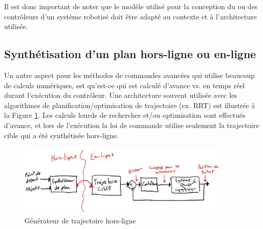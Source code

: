 Il est donc important de noter que le modèle utilisé pour la conception du ou des contrôleurs d'un système robotisé doit être adapté au contexte et à l'architecture utilisée. 


\subsection{Synthétisation d'un plan hors-ligne ou en-ligne}

Un autre aspect pour les méthodes de commandes avancées qui utilise beaucoup de calculs numériques, est qu'est-ce qui est calculé d'avance vs. en temps réel durant l'exécution du contrôleur. Une architecture souvent utilisée avec les algorithmes de planification/optimisation de trajectoire (ex. RRT) est illustrée à la Figure \ref{fig:offlinetrajectorygeneration}. Les calculs lourds de rechercher et/ou optimisation sont effectués d'avance, et lors de l'exécution la loi de commande utilise seulement la trajectoire cible qui a été synthétisée hors-ligne.
\begin{figure}[htbp]
	\centering
		\includegraphics[width=0.9\textwidth]{fig/offlinetrajectorygeneration.jpg}
	\caption{Générateur de trajectoire hors-ligne}
	\label{fig:offlinetrajectorygeneration}
\end{figure}

